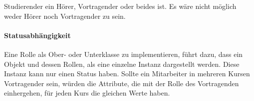 \documentclass[conference]{IEEEtran}
\begin{document}
Studierender ein Hörer, Vortragender oder beides ist. Es wäre nicht möglich weder Hörer noch Vortragender zu sein. \paragraph{Statusabhängigkeit} Eine Rolle als Ober- oder Unterklasse zu implementieren, führt dazu, dass ein Objekt und dessen Rollen, als eine einzelne Instanz dargestellt werden. Diese Instanz kann nur einen Status haben. Sollte ein Mitarbeiter in mehreren Kursen Vortragender sein, würden die Attribute, die mit der Rolle des Vortragenden einhergehen, für jeden Kurs die gleichen Werte haben. 



\end{document}
